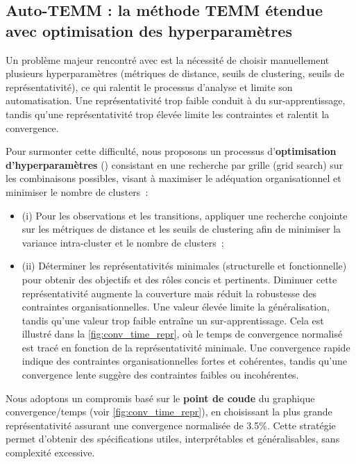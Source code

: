 \subsection{Auto-TEMM : la méthode TEMM étendue avec optimisation des hyperparamètres}

Un problème majeur rencontré avec  est la nécessité de choisir manuellement plusieurs hyperparamètres (métriques de distance, seuils de clustering, seuils de représentativité), ce qui ralentit le processus d'analyse et limite son automatisation. Une représentativité trop faible conduit à du sur-apprentissage, tandis qu'une représentativité trop élevée limite les contraintes et ralentit la convergence.


Pour surmonter cette difficulté, nous proposons un processus d'\textbf{optimisation d'hyperparamètres} () consistant en une recherche par grille (grid search) sur les combinaisons possibles, visant à maximiser le adéquation  organisationnel et minimiser le nombre de clusters~:

\begin{itemize}
    \item (i) Pour les observations et les transitions, appliquer une recherche conjointe sur les métriques de distance et les seuils de clustering afin de minimiser la variance intra-cluster et le nombre de clusters~;
    \item (ii) Déterminer les représentativités minimales (structurelle et fonctionnelle) pour obtenir des objectifs et des rôles concis et pertinents. Diminuer cette représentativité augmente la couverture mais réduit la robustesse des contraintes organisationnelles. Une valeur élevée limite la généralisation, tandis qu'une valeur trop faible entraîne un sur-apprentissage. Cela est illustré dans la \autoref{fig:conv_time_repr}, où le temps de convergence normalisé est tracé en fonction de la représentativité minimale. Une convergence rapide indique des contraintes organisationnelles fortes et cohérentes, tandis qu'une convergence lente suggère des contraintes faibles ou incohérentes.
\end{itemize}

Nous adoptons un compromis basé sur le \textbf{point de coude} du graphique convergence/temps (voir \autoref{fig:conv_time_repr}), en choisissant la plus grande représentativité assurant une convergence normalisée de 3.5\%. Cette stratégie permet d'obtenir des spécifications utiles, interprétables et généralisables, sans complexité excessive.

